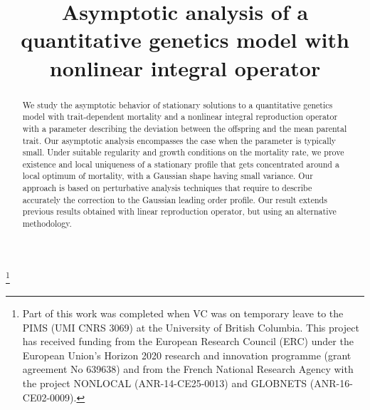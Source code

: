 \documentclass[JEP,XML,SOM,Unicode]{cedram}
\theoremstyle{plain}
\theoremstyle{definition}
\begin{document}
\title{Asymptotic analysis of a quantitative genetics model with nonlinear integral operator}

\author[\initial{V.} \lastname{Calvez}]{ }
\address{ICJ, UMR 5208 CNRS \& Universit\'{e} Claude Bernard Lyon 1, Lyon, France}

\author[\initial{T.} \lastname{Garnier}]{ }
\address{LAMA, UMR 5127 CNRS \& Univ. Savoie Mont-Blanc, Chambéry, France}

\author[\initial{F.} \lastname{Patout}]{ }
\address{UMPA, UMR 5669 CNRS \& Ecole Normale Sup\'erieure de Lyon, Lyon, France}

\thanks{Part of this work was completed when VC was on temporary leave to the PIMS (UMI CNRS 3069) at the University of British Columbia. This project has received funding from the European Research Council (ERC) under the European Union’s Horizon 2020 research and innovation programme (grant agreement No 639638) and from the French National Research Agency with the project NONLOCAL (ANR-14-CE25-0013) and GLOBNETS (ANR-16-CE02-0009).}



\begin{abstract}
We study the asymptotic behavior of stationary solutions to a quantitative genetics model with trait-dependent mortality and a nonlinear integral reproduction operator with a parameter describing the deviation between the offspring and the mean parental trait.
Our asymptotic analysis encompasses the case when the parameter is typically small. Under suitable regularity and growth conditions on the mortality rate, we prove existence and local uniqueness of a stationary profile that gets concentrated around a local optimum of mortality, with a Gaussian shape having small variance. Our approach is based on perturbative analysis techniques that require to describe accurately the correction to the Gaussian leading order profile. Our result extends previous results obtained with linear reproduction operator, but using an alternative methodology.
\end{abstract}
\end{document}
